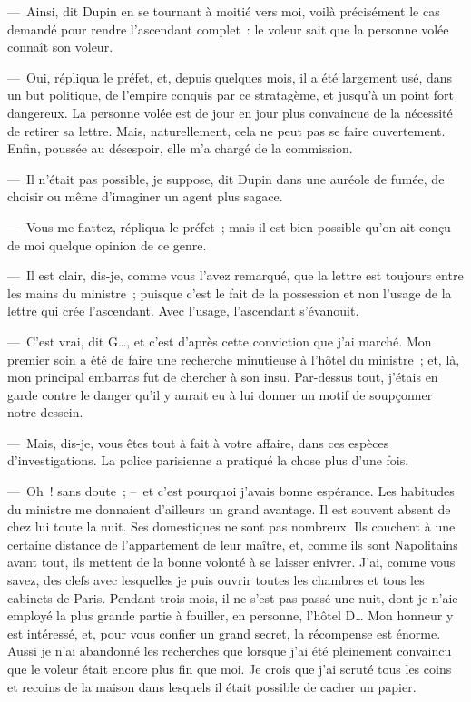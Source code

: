 \documentclass[french,twoside]{book} %
\begin{document}
— Ainsi, dit Dupin en se tournant à moitié vers moi, voilà précisément le cas demandé pour rendre l’ascendant complet : le voleur sait que la personne volée connaît son voleur.\par
— Oui, répliqua le préfet, et, depuis quelques mois, il a été largement usé, dans un but politique, de l’empire conquis par ce stratagème, et jusqu’à un point fort dangereux. La personne volée est de jour en jour plus convaincue de la nécessité de retirer sa lettre. Mais, naturellement, cela ne peut pas se faire ouvertement. Enfin, poussée au désespoir, elle m’a chargé de la commission.\par
— Il n’était pas possible, je suppose, dit Dupin dans une auréole de fumée, de choisir ou même d’imaginer un agent plus sagace.\par
— Vous me flattez, répliqua le préfet ; mais il est bien possible qu’on ait conçu de moi quelque opinion de ce genre.\par
— Il est clair, dis-je, comme vous l’avez remarqué, que la lettre est toujours entre les mains du ministre ; puisque c’est le fait de la possession et non l’usage de la lettre qui crée l’ascendant. Avec l’usage, l’ascendant s’évanouit.\par
— C’est vrai, dit G…, et c’est d’après cette conviction que j’ai marché. Mon premier soin a été de faire une recherche minutieuse à l’hôtel du ministre ; et, là, mon principal embarras fut de chercher à son insu. Par-dessus tout, j’étais en garde contre le danger qu’il y aurait eu à lui donner un motif de soupçonner notre dessein.\par
— Mais, dis-je, vous êtes tout à fait à votre affaire, dans ces espèces d’investigations. La police parisienne a pratiqué la chose plus d’une fois.\par
— Oh ! sans doute ; – et c’est pourquoi j’avais bonne espérance. Les habitudes du ministre me donnaient d’ailleurs un grand avantage. Il est souvent absent de chez lui toute la nuit. Ses domestiques ne sont pas nombreux. Ils couchent à une certaine distance de l’appartement de leur maître, et, comme ils sont Napolitains avant tout, ils mettent de la bonne volonté à se laisser enivrer. J’ai, comme vous savez, des clefs avec lesquelles je puis ouvrir toutes les chambres et tous les cabinets de Paris. Pendant trois mois, il ne s’est pas passé une nuit, dont je n’aie employé la plus grande partie à fouiller, en personne, l’hôtel D… Mon honneur y est intéressé, et, pour vous confier un grand secret, la récompense est énorme. Aussi je n’ai abandonné les recherches que lorsque j’ai été pleinement convaincu que le voleur était encore plus fin que moi. Je crois que j’ai scruté tous les coins et recoins de la maison dans lesquels il était possible de cacher un papier.\par
\end{document}
